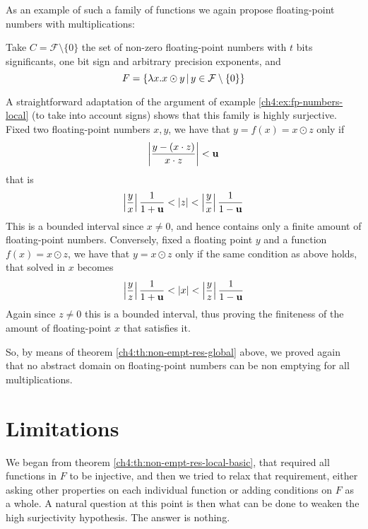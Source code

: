 As an example of such a family of functions we again propose floating-point numbers with multiplications:
\begin{example}
	Take $C = \mathcal{F} \setminus \{ 0 \}$ the set of non-zero floating-point numbers with $t$ bits significants, one bit sign and arbitrary precision exponents, and
	\[
	F = \{ \lambda x . x \odot y \,\vert\, y \in \mathcal{F} \setminus \{ 0 \} \}
	\]

	A straightforward adaptation of the argument of example \ref{ch4:ex:fp-numbers-local} (to take into account signs) shows that this family is highly surjective.
	Fixed two floating-point numbers $x, y$, we have that $y = f(x) = x \odot z$ only if
	\[
	\left\lvert \frac{y - (x \cdot z)}{x \cdot z} \right\rvert < \textbf{u}
	\]
	that is
	\[
	\left\lvert\frac{y}{x}\right\rvert \frac{1}{1+\textbf{u}} < \lvert z\rvert < \left\lvert\frac{y}{x}\right\rvert \frac{1}{1-\textbf{u}}
	\]
	This is a bounded interval since $x \neq 0$, and hence contains only a finite amount of floating-point numbers.
	Conversely, fixed a floating point $y$ and a function $f(x) = x \odot z$, we have that $y = x \odot z$ only if the same condition as above holds, that solved in $x$ becomes
	\[
	\left\lvert\frac{y}{z}\right\rvert \frac{1}{1+\textbf{u}} < \lvert x\rvert < \left\lvert\frac{y}{z}\right\rvert \frac{1}{1-\textbf{u}}
	\]
	Again since $z \neq 0$ this is a bounded interval, thus proving the finiteness of the amount of floating-point $x$ that satisfies it.

	So, by means of theorem \ref{ch4:th:non-empt-res-global} above, we proved again that no abstract domain on floating-point numbers can be non emptying for all multiplications.
\end{example}

\section{Limitations}
We began from theorem \ref{ch4:th:non-empt-res-local-basic}, that required all functions in $F$ to be injective, and then we tried to relax that requirement, either asking other properties on each individual function or adding conditions on $F$ as a whole.
A natural question at this point is then what can be done to weaken the high surjectivity hypothesis. The answer is nothing.

